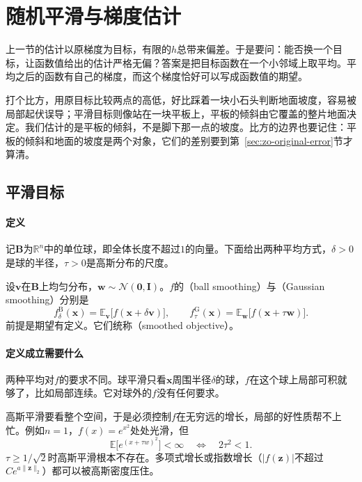 \section{随机平滑与梯度估计}
\label{sec:zo-smoothing}

上一节的估计以原梯度为目标，有限的$h$总带来偏差。于是要问：能否换一个目标，让函数值给出的估计严格无偏？答案是把目标函数在一个小邻域上取平均。平均之后的函数有自己的梯度，而这个梯度恰好可以写成函数值的期望。

打个比方，用原目标比较两点的高低，好比踩着一块小石头判断地面坡度，容易被局部起伏误导；平滑目标则像站在一块平板上，平板的倾斜由它覆盖的整片地面决定。我们估计的是平板的倾斜，不是脚下那一点的坡度。比方的边界也要记住：平板的倾斜和地面的坡度是两个对象，它们的差别要到第~\ref{sec:zo-original-error}节才算清。

\subsection{平滑目标}
\label{sec:zo-smooth-target}

\paragraph{定义}
记$\bm{B}$为$\mathbb{R}^n$中的单位球，即全体长度不超过$1$的向量。下面给出两种平均方式，$\delta>0$是球的半径，$\tau>0$是高斯分布的尺度。

\begin{definition}[球平滑与高斯平滑]
\label{def:zo-smoothing}
设$\bm{v}$在$\bm{B}$上均匀分布，$\bm{w}\sim\mathcal{N}(\bm{0},\bm{I})$。$f$的（ball smoothing）与（Gaussian smoothing）分别是
\begin{equation}
 f^{\mathrm{B}}_{\delta}(\bm{x})=\mathbb{E}_{\bm{v}}\bigl[f(\bm{x}+\delta\bm{v})\bigr],\qquad
 f^{\mathrm{G}}_{\tau}(\bm{x})=\mathbb{E}_{\bm{w}}\bigl[f(\bm{x}+\tau\bm{w})\bigr].
 \label{eq:zo-smoothing}
\end{equation}
前提是期望有定义。它们统称（smoothed objective）。
\end{definition}

\paragraph{定义成立需要什么}
两种平均对$f$的要求不同。球平滑只看$\bm{x}$周围半径$\delta$的球，$f$在这个球上局部可积就够了，比如局部连续。它对球外的$f$没有任何要求。

高斯平滑要看整个空间，于是必须控制$f$在无穷远的增长，局部的好性质帮不上忙。例如$n=1$，$f(x)=e^{x^2}$处处光滑，但
\[
 \mathbb{E}\bigl[e^{(x+\tau w)^2}\bigr]<\infty\quad\Longleftrightarrow\quad 2\tau^2<1.
\]
$\tau\geq1/\sqrt{2}$时高斯平滑根本不存在。多项式增长或指数增长（$\lvert f(\bm{z})\rvert$不超过$Ce^{a\lVert\bm{z}\rVert_2}$）都可以被高斯密度压住。

